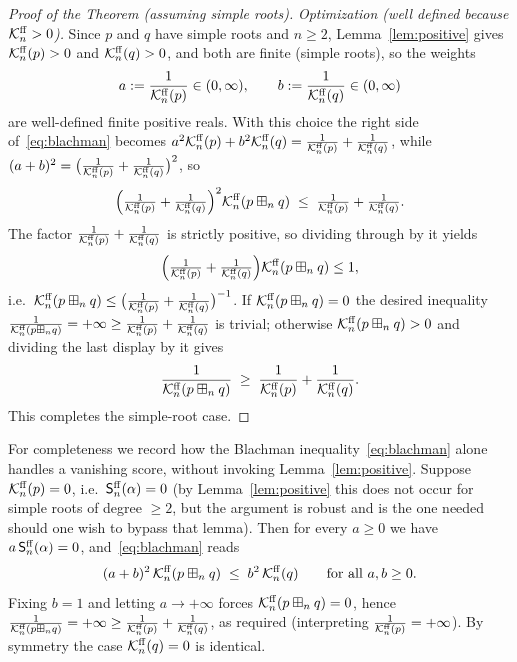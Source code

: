 \begin{proof}[Proof of the Theorem (assuming simple roots)]
\smallskip\noindent\textit{Optimization (well defined because $\mathcal{K}^{\mathrm{ff}}_n>0$).}
Since $p$ and $q$ have simple roots and $n\ge2$, Lemma~\ref{lem:positive} gives
$\mathcal{K}^{\mathrm{ff}}_n(p)>0$ and $\mathcal{K}^{\mathrm{ff}}_n(q)>0$, and both are finite (simple roots), so the
weights
\[
a:=\frac{1}{\mathcal{K}^{\mathrm{ff}}_n(p)}\in(0,\infty),\qquad b:=\frac{1}{\mathcal{K}^{\mathrm{ff}}_n(q)}\in(0,\infty)
\]
are well-defined finite positive reals. With this choice the right side
of~\eqref{eq:blachman} becomes
$a^2\mathcal{K}^{\mathrm{ff}}_n(p)+b^2\mathcal{K}^{\mathrm{ff}}_n(q)=\tfrac{1}{\mathcal{K}^{\mathrm{ff}}_n(p)}+\tfrac{1}{\mathcal{K}^{\mathrm{ff}}_n(q)}$,
while $(a+b)^2=\bigl(\tfrac{1}{\mathcal{K}^{\mathrm{ff}}_n(p)}+\tfrac{1}{\mathcal{K}^{\mathrm{ff}}_n(q)}\bigr)^2$, so
\[
\Bigl(\tfrac{1}{\mathcal{K}^{\mathrm{ff}}_n(p)}+\tfrac{1}{\mathcal{K}^{\mathrm{ff}}_n(q)}\Bigr)^2\mathcal{K}^{\mathrm{ff}}_n(p\boxplus_n q)
\;\le\;\tfrac{1}{\mathcal{K}^{\mathrm{ff}}_n(p)}+\tfrac{1}{\mathcal{K}^{\mathrm{ff}}_n(q)} .
\]
The factor $\tfrac{1}{\mathcal{K}^{\mathrm{ff}}_n(p)}+\tfrac{1}{\mathcal{K}^{\mathrm{ff}}_n(q)}$ is strictly positive,
so dividing through by it yields
\[
\Bigl(\tfrac{1}{\mathcal{K}^{\mathrm{ff}}_n(p)}+\tfrac{1}{\mathcal{K}^{\mathrm{ff}}_n(q)}\Bigr)\mathcal{K}^{\mathrm{ff}}_n(p\boxplus_n q)\le1,
\]
i.e.\ $\mathcal{K}^{\mathrm{ff}}_n(p\boxplus_n q)\le\bigl(\tfrac{1}{\mathcal{K}^{\mathrm{ff}}_n(p)}+\tfrac{1}{\mathcal{K}^{\mathrm{ff}}_n(q)}\bigr)^{-1}$.
If $\mathcal{K}^{\mathrm{ff}}_n(p\boxplus_n q)=0$ the desired inequality
$\tfrac{1}{\mathcal{K}^{\mathrm{ff}}_n(p\boxplus_n q)}=+\infty\ge\tfrac{1}{\mathcal{K}^{\mathrm{ff}}_n(p)}+\tfrac{1}{\mathcal{K}^{\mathrm{ff}}_n(q)}$
is trivial; otherwise $\mathcal{K}^{\mathrm{ff}}_n(p\boxplus_n q)>0$ and dividing the last display by it gives
\[
\frac{1}{\mathcal{K}^{\mathrm{ff}}_n(p\boxplus_n q)}\;\ge\;\frac{1}{\mathcal{K}^{\mathrm{ff}}_n(p)}+\frac{1}{\mathcal{K}^{\mathrm{ff}}_n(q)} .
\]
This completes the simple-root case.
\end{proof}

\begin{qfourobservation}[the degenerate case $\qfourInfo=0$ in general]\label{obs:degenerate}
For completeness we record how the Blachman inequality~\eqref{eq:blachman} alone
handles a vanishing score, without invoking Lemma~\ref{lem:positive}. Suppose
$\mathcal{K}^{\mathrm{ff}}_n(p)=0$, i.e.\ $\mathsf{S}^{\mathrm{ff}}_n(\alpha)=0$ (by Lemma~\ref{lem:positive} this
does not occur for simple roots of degree $\ge2$, but the argument is robust and is
the one needed should one wish to bypass that lemma). Then for every $a\ge0$ we have
$a\,\mathsf{S}^{\mathrm{ff}}_n(\alpha)=0$, and~\eqref{eq:blachman} reads
\[
(a+b)^2\,\mathcal{K}^{\mathrm{ff}}_n(p\boxplus_n q)\;\le\;b^2\,\mathcal{K}^{\mathrm{ff}}_n(q)\qquad\text{for all }a,b\ge0 .
\]
Fixing $b=1$ and letting $a\to+\infty$ forces $\mathcal{K}^{\mathrm{ff}}_n(p\boxplus_n q)=0$, hence
$\tfrac{1}{\mathcal{K}^{\mathrm{ff}}_n(p\boxplus_n q)}=+\infty\ge\tfrac{1}{\mathcal{K}^{\mathrm{ff}}_n(p)}+\tfrac{1}{\mathcal{K}^{\mathrm{ff}}_n(q)}$,
as required (interpreting $\tfrac1{\mathcal{K}^{\mathrm{ff}}_n(p)}=+\infty$). By symmetry the case
$\mathcal{K}^{\mathrm{ff}}_n(q)=0$ is identical.
\end{qfourobservation}

